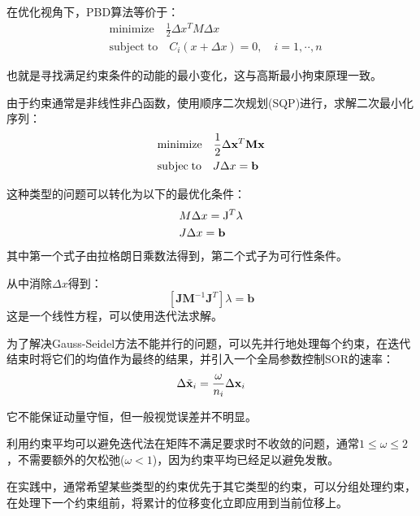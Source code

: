 \documentclass{CLGPY}
\begin{document}
\begin{multicols}{2}
		在优化视角下，PBD算法等价于：
		\begin{equation}
		\begin{split}
			&\mathrm{minimize}\quad \frac{1}{2}\Delta x^{T}M\Delta x\\ 
			&\mathrm{subject\;to}\quad C_{i}(x+ \Delta x)=0,\quad i=1,\cdot\cdot,n			
		\end{split}
		\end{equation}

		也就是寻找满足约束条件的动能的最小变化，这与高斯最小拘束原理一致。

		由于约束通常是非线性非凸函数，使用顺序二次规划(SQP)进行，求解二次最小化序列：
		\begin{equation}
		\begin{split}
			&\mathrm{minimize}\quad\mathrm{\frac{1}{2}}\Delta{\bf x}^{T}{\bf M}{\bf x}\\
			&\mathrm{subjec \; to}\quad J\Delta x={\bf b}		
		\end{split}
		\end{equation}
		
		这种类型的问题可以转化为以下的最优化条件：
		\begin{equation}
		\begin{split}
			&M\Delta x=\mathrm{J}^{T}\lambda\\ 
			&J\Delta x={\bf b}	
		\end{split}
		\end{equation}
		其中第一个式子由拉格朗日乘数法得到，第二个式子为可行性条件。

		从中消除$\Delta x$得到：
       \begin{equation}
			\left[\mathbf{JM}^{-1}\mathbf{J}^{T}\right]\lambda=\mathbf{b}
		\end{equation}
		这是一个线性方程，可以使用迭代法求解。

		为了解决Gauss-Seidel方法不能并行的问题，可以先并行地处理每个约束，在迭代结束时将它们的均值作为最终的结果，并引入一个全局参数控制SOR的速率：
       \begin{equation}
			\Delta\tilde{\bf x}_{i}=\frac{\omega}{n_{i}}\Delta{\bf x}_{i}
		\end{equation}

		它不能保证动量守恒，但一般视觉误差并不明显。

		利用约束平均可以避免迭代法在矩阵不满足要求时不收敛的问题，通常$1 \le \omega \le 2$，不需要额外的欠松弛($\omega < 1$)，因为约束平均已经足以避免发散。

		在实践中，通常希望某些类型的约束优先于其它类型的约束，可以分组处理约束，在处理下一个约束组前，将累计的位移变化立即应用到当前位移上。


\end{multicols}
\end{document}
